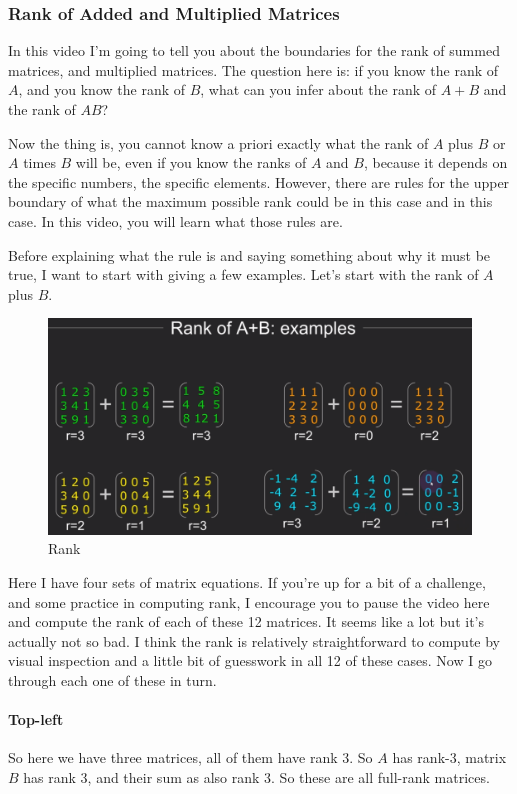 \documentclass[fleqn,10pt]{olplainarticle}
\theoremstyle{definition}
\theoremstyle{remark}
\begin{document}
\pagebreak

\subsubsection*{Rank of Added and Multiplied Matrices}

In this video I'm going to tell you about the boundaries for the rank of summed matrices, and multiplied matrices. The question here is: if you know the rank of $A$, and you know the rank of $B$, what can you infer about the rank of $A + B$ and the rank of $AB$?

Now the thing is, you cannot know a priori exactly what the rank of $A$ plus $B$ or $A$ times $B$ will be, even if you know the ranks of $A$ and $B$, because it depends on the specific numbers, the specific elements. However, there are rules for the upper boundary of what the maximum possible rank could be in this case and in this case. In this video, you will learn what those rules are.

Before explaining what the rule is and saying something about why it must be true, I want to start with giving a few examples. Let's start with the rank of $A$ plus $B$.

\begin{figure}[ht]
	\centering
	\includegraphics[width=0.5\linewidth]{images/rank-18.png}
	\caption{Rank}
	\label{fig:rank_18}
\end{figure}

Here I have four sets of matrix equations. If you're up for a bit of a challenge, and some practice in computing rank, I encourage you to pause the video here and compute the rank of each of these 12 matrices.  It seems like a lot but it's actually not so bad. I think the rank is relatively straightforward to compute by visual inspection and a little bit of guesswork in all 12 of these cases. Now I go through each one of these in turn. 

\paragraph{Top-left}

So here we have three matrices, all of them have rank 3. So $A$ has rank-3, matrix $B$ has rank 3, and their sum as also rank 3. So these are all full-rank matrices.
\end{document}
